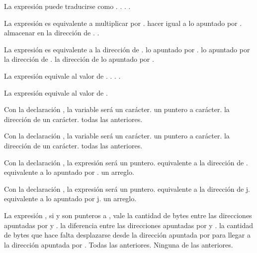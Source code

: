 

\begin{preguntas}
\label{sec:tc-punteros-preg}
\question La expresión  puede traducirse como
\choice {}.
\correctchoice {}.
\choice {}.
\choice {}
\choice {}.

\question La expresión  es equivalente a
\choice multiplicar  por .
\correctchoice hacer  igual a lo apuntado por .
\choice almacenar en  la dirección de .
\choice {}.

\question La expresión  es equivalente a
\choice la dirección de .
\choice lo apuntado por .
\choice lo apuntado por la dirección de .
\correctchoice la dirección de lo apuntado por .

\question La expresión  equivale al valor de 
\choice {}.
\choice {}.
\correctchoice {}.
\choice {}.

\question La expresión  equivale al valor de 
\choice {}
\choice {}
\correctchoice {}
\choice {}.

\question Con la declaración , la variable  será
\choice un carácter.
\correctchoice un puntero a carácter.
\choice la dirección de un carácter.
\choice todas las anteriores.

\question Con la declaración , la variable  será
\correctchoice un carácter. 
\choice un puntero a carácter.
\choice la dirección de un carácter.
\choice todas las anteriores.

\question Con la declaración , la expresión  será
\choice un puntero.
\correctchoice equivalente a la dirección de .
\choice equivalente a lo apuntado por .
\choice un arreglo.

\question Con la declaración , la expresión  será
\choice un puntero.
\choice equivalente a la dirección de j.
\correctchoice equivalente a lo apuntado por j.
\choice un arreglo.

\question La expresión , si  y  son punteros a , vale
\choice la cantidad de bytes entre las direcciones apuntadas por  y .
\choice la diferencia entre las direcciones apuntadas por  y .
\choice la cantidad de bytes que hace falta desplazarse desde la dirección apuntada por  para llegar a la dirección apuntada por .
\correctchoice Todas las anteriores.
\choice Ninguna de las anteriores.


\end{preguntas}
